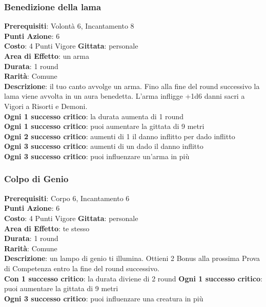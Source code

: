 \documentclass[12pt,a4paper,twoside,openany]{book}
\begin{document}
\begin{multicols}{2}
\subsubsection*{Benedizione della lama}
\textbf{Prerequisiti}: Volontà 6, Incantamento 8\\
\textbf{Punti Azione}: 6\\
\textbf{Costo}: 4 Punti Vigore
\textbf{Gittata}: personale\\
\textbf{Area di Effetto}: un arma\\
\textbf{Durata}: 1 round\\
\textbf{Rarità}: Comune\\
\textbf{Descrizione}: il tuo canto avvolge un arma. Fino alla fine del round successivo la lama viene avvolta in un aura benedetta. L'arma infligge +1d6 danni sacri a Vigori a Risorti e Demoni.\\
\textbf{Ogni 1 successo critico}: la durata aumenta di 1 round\\
\textbf{Ogni 1 successo critico}: puoi aumentare la gittata di 9 metri\\
\textbf{Ogni 2 successo critico}: aumenti di 1 il danno inflitto per dado inflitto\\
\textbf{Ogni 3 successo critico}: aumenti di un dado il danno inflitto\\
\textbf{Ogni 3 successo critico}: puoi influenzare un'arma in più

\subsubsection*{Colpo di Genio}
\textbf{Prerequisiti}: Corpo 6, Incantamento 6\\
\textbf{Punti Azione}: 6\\
\textbf{Costo}: 4 Punti Vigore
\textbf{Gittata}: personale\\
\textbf{Area di Effetto}: te stesso\\
\textbf{Durata}: 1 round\\
\textbf{Rarità}: Comune\\
\textbf{Descrizione}: un lampo di genio ti illumina. 
Ottieni 2 Bonus alla prossima Prova di Competenza entro la fine del round successivo.\\
\textbf{Con 1 successo critico}: la durata diviene di 2 round
\textbf{Ogni 1 successo critico}: puoi aumentare la gittata di 9 metri\\
\textbf{Ogni 3 successo critico}: puoi influenzare una creatura in più


\end{multicols}
\end{document}
